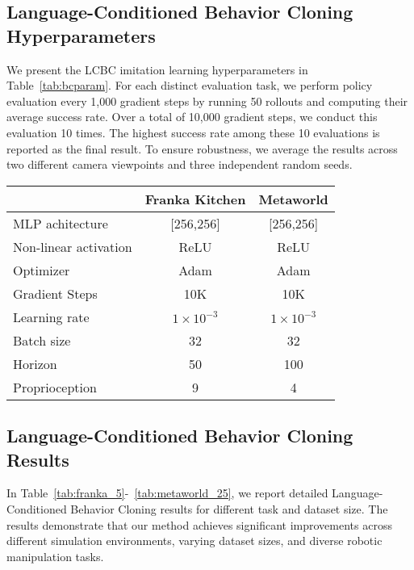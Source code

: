 \subsection{Language-Conditioned Behavior Cloning Hyperparameters}
\label{sec:app_lcbcparam}
We present the LCBC imitation learning hyperparameters in Table~\ref{tab:bcparam}. For each distinct evaluation task, we perform policy evaluation every 1,000 gradient steps by running 50 rollouts and computing their average success rate. Over a total of 10,000 gradient steps, we conduct this evaluation 10 times. The highest success rate among these 10 evaluations is reported as the final result. To ensure robustness, we average the results across two different camera viewpoints and three independent random seeds.


\begin{table*}[h]
    \centering
    \caption{Hyper-parameters for LCBC.}
    \label{tab:bcparam}
    \begin{tabular}{lcc}
        \toprule
         & Franka Kitchen & Metaworld \\
        \midrule
        MLP achitecture & [256,256] & [256,256] \\
        Non-linear activation & ReLU & ReLU \\
        Optimizer & Adam & Adam \\
        Gradient Steps & 10K & 10K \\
        Learning rate & $1 \times 10^{-3}$ & $1 \times 10^{-3}$ \\
        Batch size & 32 & 32 \\
        Horizon & 50 & 100 \\
        Proprioception & 9 & 4 \\
        \bottomrule
    \end{tabular}
    
\end{table*}

\subsection{Language-Conditioned Behavior Cloning Results} \label{sec:app_lcbc}
In Table~\ref{tab:franka_5}-~\ref{tab:metaworld_25}, we report detailed Language-Conditioned Behavior Cloning results for different task and dataset size. The results demonstrate that our method achieves significant improvements across different simulation environments, varying dataset sizes, and diverse robotic manipulation tasks.



